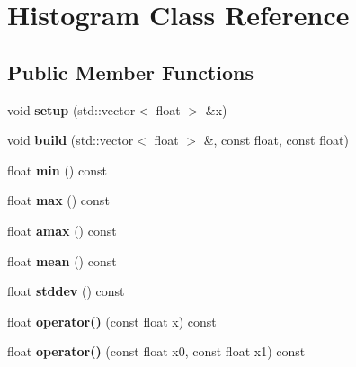 \hypertarget{classHistogram}{
\section{Histogram Class Reference}
\label{classHistogram}
}
\subsection*{Public Member Functions}
\begin{DoxyCompactItemize}
\item 
\hypertarget{classHistogram_a0ee3666513f6199c5e731f2c33b3e695}{
void {\bfseries setup} (std::vector$<$ float $>$ \&x)}
\label{classHistogram_a0ee3666513f6199c5e731f2c33b3e695}

\item 
\hypertarget{classHistogram_a49a952abbdb1e8e0ca2e82c720c6f0a2}{
void {\bfseries build} (std::vector$<$ float $>$ \&, const float, const float)}
\label{classHistogram_a49a952abbdb1e8e0ca2e82c720c6f0a2}

\item 
\hypertarget{classHistogram_aea638bcf664c05118655cbe9db5f2fbd}{
float {\bfseries min} () const }
\label{classHistogram_aea638bcf664c05118655cbe9db5f2fbd}

\item 
\hypertarget{classHistogram_a4d62a64c9f1ff9b7d0bca50127a86e68}{
float {\bfseries max} () const }
\label{classHistogram_a4d62a64c9f1ff9b7d0bca50127a86e68}

\item 
\hypertarget{classHistogram_a700226d9c2026763ede881dbf7d9a539}{
float {\bfseries amax} () const }
\label{classHistogram_a700226d9c2026763ede881dbf7d9a539}

\item 
\hypertarget{classHistogram_a04d3e46d8c5f478e2123e878fdaa17ff}{
float {\bfseries mean} () const }
\label{classHistogram_a04d3e46d8c5f478e2123e878fdaa17ff}

\item 
\hypertarget{classHistogram_a4c0823404f78f8aad0956ae4815a46f6}{
float {\bfseries stddev} () const }
\label{classHistogram_a4c0823404f78f8aad0956ae4815a46f6}

\item 
\hypertarget{classHistogram_a9eea43807d0b073ccaebd6752690c733}{
float {\bfseries operator()} (const float x) const }
\label{classHistogram_a9eea43807d0b073ccaebd6752690c733}

\item 
\hypertarget{classHistogram_a591e8d234050f114ae8b9f58f1bf8179}{
float {\bfseries operator()} (const float x0, const float x1) const }
\label{classHistogram_a591e8d234050f114ae8b9f58f1bf8179}

\end{DoxyCompactItemize}
